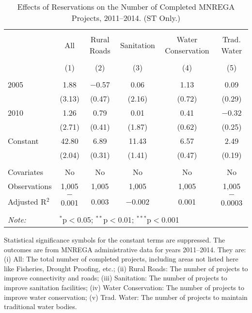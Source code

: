 \begin{table}[!htbp]
\centering
\begin{threeparttable}

  \caption{Effects of Reservations on the Number of Completed MNREGA Projects, 2011--2014. (ST Only.)} 
  \label{main_mnrega_phase_st} 
\scriptsize 
\begin{tabular}{@{\extracolsep{0pt}}lccccc} 
\\[-1.8ex]\hline 
\hline \\[-1.8ex] 
 & All & Rural Roads & Sanitation & Water Conservation & Trad. Water \\ 
\\[-1.8ex] & (1) & (2) & (3) & (4) & (5)\\ 
\hline \\[-1.8ex] 
 2005 & 1.88 & $-$0.57 & 0.06 & 1.13 & 0.09 \\ 
  & (3.13) & (0.47) & (2.16) & (0.72) & (0.29) \\ 
  2010 & 1.26 & 0.79 & 0.01 & 0.41 & $-$0.32 \\ 
  & (2.71) & (0.41) & (1.87) & (0.62) & (0.25) \\ 
  Constant & 42.80 & 6.89 & 11.43 & 6.57 & 2.49 \\ 
  & (2.04) & (0.31) & (1.41) & (0.47) & (0.19) \\ 
 \hline \\[-1.8ex] 
Covariates & No & No & No & No & No \\ 
Observations & 1,005 & 1,005 & 1,005 & 1,005 & 1,005 \\ 
Adjusted R$^{2}$ & $-$0.001 & 0.003 & $-$0.002 & 0.001 & $-$0.0003 \\ 
\hline 
\hline \\[-1.8ex] 
\textit{Note:}  & \multicolumn{5}{l}{$^{*}$p$<$0.05; $^{**}$p$<$0.01; $^{***}$p$<$0.001} \\ 
\end{tabular} 
\begin{tablenotes}[flushleft]
\scriptsize
\item[] Statistical significance symbols for the constant terms are suppressed. The outcomes are from MNREGA administrative data for years 2011--2014. They are: 
(i) All: The total number of completed projects, including areas not listed here like Fisheries, Drought Proofing, etc.;
(ii) Rural Roads: The number of projects to improve connectivity and roads;
(iii) Sanitation: The number of projects to improve sanitation facilities;
(iv) Water Conservation: The number of projects to improve water conservation;
(v) Trad. Water: The number of projects to maintain traditional water bodies.
\end{tablenotes}
\end{threeparttable}
\end{table}
